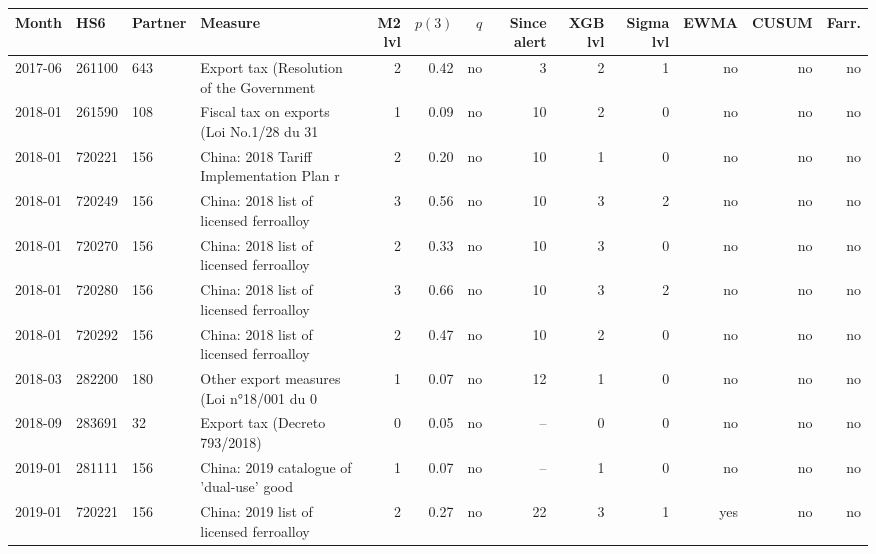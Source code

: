 \noindent\begin{minipage}{\linewidth}
\label{tab:S27}
\centering\tiny
\begin{tabular}{lllp{4.2cm}rrrrrrrrr}
\toprule
Month & HS6 & Partner & Measure & M2 lvl & $p(3)$ & $q$ & Since alert & XGB lvl & Sigma lvl & EWMA & CUSUM & Farr. \\ \midrule
2017-06 & 261100 & 643 & Export tax (Resolution of the Government & 2 & 0.42 & no & 3 & 2 & 1 & no & no & no \\
2018-01 & 261590 & 108 & Fiscal tax on exports (Loi No.1/28 du 31 & 1 & 0.09 & no & 10 & 2 & 0 & no & no & no \\
2018-01 & 720221 & 156 & China: 2018 Tariff Implementation Plan r & 2 & 0.20 & no & 10 & 1 & 0 & no & no & no \\
2018-01 & 720249 & 156 & China: 2018 list of licensed ferroalloy  & 3 & 0.56 & no & 10 & 3 & 2 & no & no & no \\
2018-01 & 720270 & 156 & China: 2018 list of licensed ferroalloy  & 2 & 0.33 & no & 10 & 3 & 0 & no & no & no \\
2018-01 & 720280 & 156 & China: 2018 list of licensed ferroalloy  & 3 & 0.66 & no & 10 & 3 & 2 & no & no & no \\
2018-01 & 720292 & 156 & China: 2018 list of licensed ferroalloy  & 2 & 0.47 & no & 10 & 2 & 0 & no & no & no \\
2018-03 & 282200 & 180 & Other export measures (Loi n°18/001 du 0 & 1 & 0.07 & no & 12 & 1 & 0 & no & no & no \\
2018-09 & 283691 & 32 & Export tax (Decreto 793/2018) & 0 & 0.05 & no & -- & 0 & 0 & no & no & no \\
2019-01 & 281111 & 156 & China: 2019 catalogue of 'dual-use' good & 1 & 0.07 & no & -- & 1 & 0 & no & no & no \\
2019-01 & 720221 & 156 & China: 2019 list of licensed ferroalloy  & 2 & 0.27 & no & 22 & 3 & 1 & yes & no & no \\

\end{tabular}
\end{minipage}
